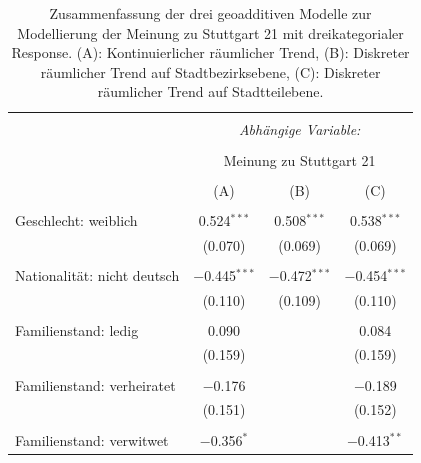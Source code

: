 \documentclass{Vorlage}
\begin{document}
\begin{appendix}


\clearpage

\begin{table}[h] \centering 
  \caption{Zusammenfassung der drei geoadditiven Modelle zur Modellierung der Meinung zu Stuttgart 21 mit dreikategorialer Response. (A): Kontinuierlicher räumlicher Trend, (B): Diskreter räumlicher Trend auf Stadtbezirksebene, (C): Diskreter räumlicher Trend auf Stadtteilebene.} 
  \label{ParameterTabS213spat} 
\begin{tabular}{@{\extracolsep{5pt}}lccc} 
\\[-1.8ex]\hline 
\hline \\[-1.8ex] 
 & \multicolumn{3}{c}{\textit{Abhängige Variable:}} \\ 
\cline{2-4} 
\\[-1.8ex] & \multicolumn{3}{c}{Meinung zu Stuttgart 21} \\ 
\\[-1.8ex] & (A) & (B) & (C)\\ 
\hline \\[-1.8ex] 
 Geschlecht: weiblich & 0.524$^{***}$ & 0.508$^{***}$ & 0.538$^{***}$ \\ 
  & (0.070) & (0.069) & (0.069) \\ 
  & & & \\ 
 Nationalität: nicht deutsch & $-$0.445$^{***}$ & $-$0.472$^{***}$ & $-$0.454$^{***}$ \\ 
  & (0.110) & (0.109) & (0.110) \\ 
  & & & \\ 
 Familienstand: ledig & 0.090 &  & 0.084 \\ 
  & (0.159) &  & (0.159) \\ 
  & & & \\ 
 Familienstand: verheiratet & $-$0.176 &  & $-$0.189 \\ 
  & (0.151) &  & (0.152) \\ 
  & & & \\ 
 Familienstand: verwitwet & $-$0.356$^{*}$ &  & $-$0.413$^{**}$ \\ 

\end{tabular}
\end{table}
\end{appendix}
\end{document}
